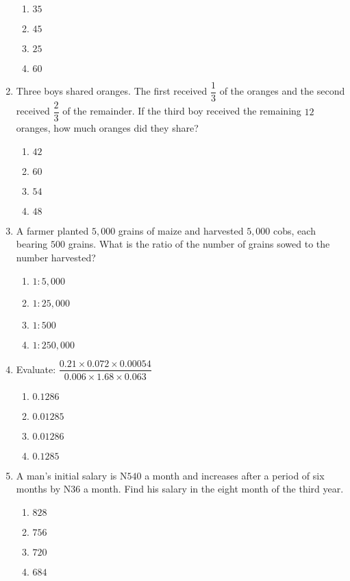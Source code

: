 \begin{multicols}{2}
\begin{enumerate}[label={\arabic*.}]
    \begin{enumerate}[label={\Alph*.}]
    \item \(35\)
    \item \(45\)
    \item \(25\)
    \item \(60\)
    \end{enumerate}
\item Three boys shared oranges. The first received \(\dfrac{1}{3}\) of the oranges and the second received \(\dfrac{2}{3}\)
of the remainder. If the third boy received the remaining \(12\) oranges, how much oranges did they share?
    \begin{enumerate}[label={\Alph*.}]
    \item \(42\)
    \item \(60\)
    \item \(54\)
    \item \(48\)
    \end{enumerate}
\item A farmer planted \(5,000\) grains of maize and harvested \(5,000\) cobs, each bearing \(500\) grains. What is the ratio of the number of grains sowed 
to the number harvested? 
    \begin{enumerate}[label={\Alph*.}]
    \item \(1:5,000\)
    \item \(1:25,000\)
    \item \(1:500\)
    \item \(1:250,000\)
    \end{enumerate}
\item Evaluate: \(\dfrac{0.21 \times 0.072 \times 0.00054}{0.006 \times 1.68 \times 0.063}\)
    \begin{enumerate}[label={\Alph*.}]
    \item \(0.1286\)
    \item \(0.01285\)
    \item \(0.01286\)
    \item \(0.1285\)
    \end{enumerate}
\item A man's initial salary is N\(540\) a month and increases after a period of six months by N\(36\) a
month. Find his salary in the eight month of the third year. 
    \begin{enumerate}[label={\Alph*.}]
    \item \(828\)
    \item \(756\)
    \item \(720\)
    \item \(684\)

\end{enumerate}
\end{enumerate}
\end{multicols}
